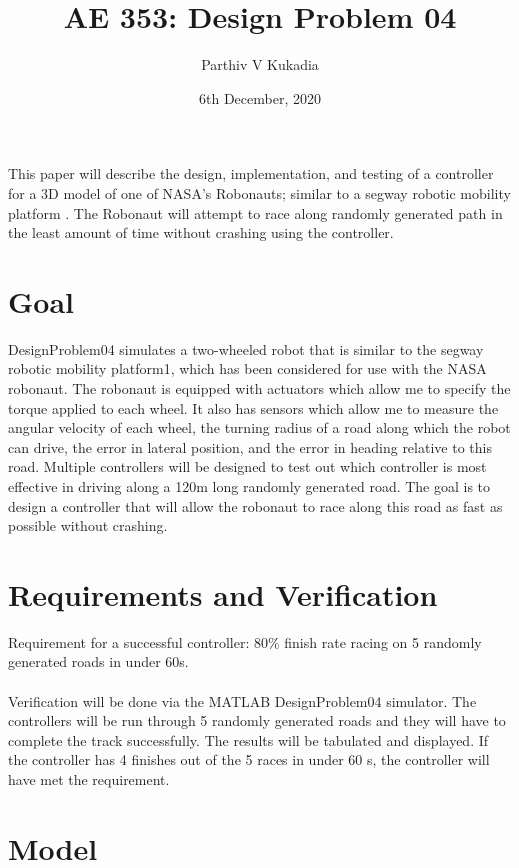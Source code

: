 \documentclass{article}
\title{AE 353: Design Problem 04}
\author{Parthiv V Kukadia}
\date{6th December, 2020}
\begin{document}
\maketitle
This paper will describe the design, implementation, and testing of a controller for a 3D model of one of NASA’s Robonauts; similar to a segway robotic mobility platform \cite{RMP}. The Robonaut will attempt to race along randomly generated path in the least amount of time without crashing using the controller.

\section{Goal}
DesignProblem04 simulates a two-wheeled robot that is similar to the segway robotic mobility platform1, which has been considered for use with the NASA robonaut. The robonaut is equipped with actuators which allow me to specify the torque applied to each wheel. It also has sensors which allow me to measure the angular velocity of each wheel, the turning radius of a road along which the robot can drive, the error in lateral position, and the error in heading relative to this road. Multiple controllers will be designed to test out which controller is most effective in driving along a 120m long randomly generated road. The goal is to design a controller that will allow the robonaut to race along this road as fast as possible without crashing.

\section{Requirements and Verification}
Requirement for a successful controller: 80$\%$ finish rate racing on 5 randomly generated roads in under 60s.\\
\\
Verification will be done via the MATLAB DesignProblem04 simulator. The controllers will be run through 5 randomly generated roads and they will have to complete the track successfully. The results will be tabulated and displayed. If the controller has 4 finishes out of the 5 races in under 60 s, the controller will have met the requirement.

\section{Model}
\end{document}
